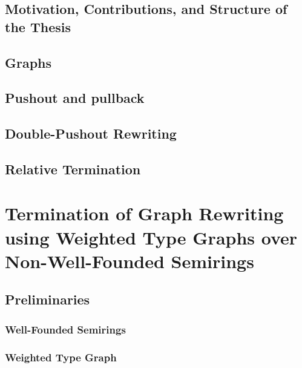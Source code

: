 \documentclass{report}
\begin{document}
\section{Motivation, Contributions, and Structure of the Thesis} 

\section{Graphs}
 
\section{Pushout and pullback}  

\section{Double-Pushout Rewriting}
 
\section{Relative Termination}



\chapter{Termination of Graph Rewriting using Weighted Type Graphs over Non-Well-Founded Semirings} 
\label{chap:nwf}



\section{Preliminaries}
\subsection{Well-Founded Semirings} 
\label{sec:well_founded_semiring}

\subsection{Weighted Type Graph} 
\label{sec:weighted_type_graph}

%  
\end{document}

